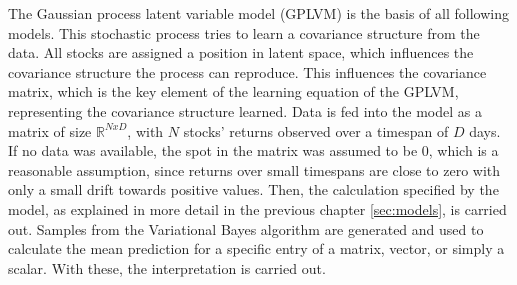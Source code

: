 The Gaussian process latent variable model (GPLVM) is the basis of all following models. This stochastic process tries to learn a covariance structure from the data. All stocks are assigned a position in latent space, which influences the covariance structure the process can reproduce. This influences the covariance matrix, which is the key element of the learning equation of the GPLVM, representing the covariance structure learned. Data is fed into the model as a matrix of size $\mathbb{R}^{NxD}$, with $N$ stocks' returns observed over a timespan of $D$ days. If no data was available, the spot in the matrix was assumed to be 0, which is a reasonable assumption, since returns over small timespans are close to zero with only a small drift towards positive values. Then, the calculation specified by the model, as explained in more detail in the previous chapter \ref{sec:models}, is carried out. Samples from the Variational Bayes algorithm are generated and used to calculate the mean prediction for a specific entry of a matrix, vector, or simply a scalar. With these, the interpretation is carried out. 
